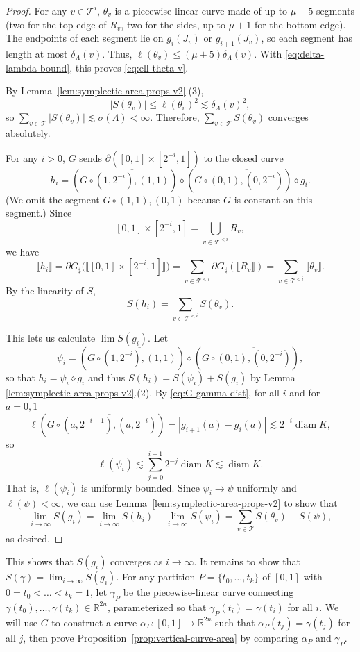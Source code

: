 \documentclass[12pt,reqno]{amsart}
\newcommand{\fcl}[1]{\llbracket{#1}\rrbracket}
\newcommand{\cT}{\mathcal{T}}
\newcommand{\R}{\mathbb{R}}
\newcommand{\from}{\colon}
\theoremstyle{remark}
\newcommand{\0}{\mathbf{0}}
\renewcommand{\1}{\mathbf 1}
\DeclareMathOperator{\diam}{diam}
\begin{document}
\begin{proof}
  For any $v\in \cT^i$, $\theta_v$ is a piecewise-linear curve made of up to $\mu+5$ segments (two for the top edge of $R_v$, two for the sides, up to $\mu+1$ for the bottom edge). The endpoints of each segment lie on $g_i(J_v)$ or $g_{i+1}(J_v)$, so each segment has length at most $\delta_\Lambda(v)$. Thus, $\ell(\theta_v) \le (\mu + 5)\delta_\Lambda(v)$. With \eqref{eq:delta-lambda-bound}, this proves \eqref{eq:ell-theta-v}. 

  By Lemma~\ref{lem:symplectic-area-props-v2}.(3),
  $$
  |S(\theta_v)| \leq \ell(\theta_v)^2 \lesssim \delta_\Lambda(v)^2,
  $$
  so $\sum_{v\in \cT} |S(\theta_v)| \lesssim \sigma(\Lambda)<\infty$. Therefore, $\sum_{v\in \cT}S(\theta_v)$ converges absolutely.

  For any $i>0$, $G$ sends $\partial([0,1]\times [2^{-i},1])$ to the closed curve
  $$h_i = (G\circ \overline{(1,2^{-i}),(1,1)}) \diamond (G\circ \overline{(0,1),(0,2^{-i})}) \diamond g_i.$$
  (We omit the segment $G\circ \overline{(1,1),(0,1)}$ because $G$ is constant on this segment.)
  Since   
  $$[0,1]\times [2^{-i},1] = \bigcup_{v\in \cT^{<i}}R_v,$$
  we have
  $$
  \fcl{h_i} = \partial G_\sharp\Big(\big\llbracket[0,1]\times [2^{-i},1]\big\rrbracket\Big) = \sum_{v\in \cT^{<i}} \partial G_\sharp(\fcl{R_v}) = \sum_{v\in \cT^{<i}}\fcl{\theta_v}.
  $$
  By the linearity of $S$,
  $$
  S(h_i) = \sum_{v\in \cT^{<i}}S(\theta_v).
  $$

  This lets us calculate $\lim S(g_i)$. Let
  $$\psi_i = \left(G\circ \overline{(1,2^{-i}),(1,1)}\right) \diamond \left(G\circ \overline{(0,1),(0,2^{-i})}\right),$$
  so that $h_i = \psi_i \diamond g_i$ and thus $S(h_i) = S(\psi_i) + S(g_i)$ by Lemma \ref{lem:symplectic-area-props-v2}.(2).
  By \eqref{eq:G-gamma-dist}, for all $i$ and for $a=0,1$
  $$\ell(G \circ \overline{(a,2^{-i-1}),(a,2^{-i})}) = |g_{i+1}(a) - g_i(a)| \lesssim 2^{-i}\diam K,$$
  so
  $$\ell(\psi_i) \lesssim \sum_{j=0}^{i-1} 2^{-j}\diam K \lesssim \diam K.$$
  That is, $\ell(\psi_i)$ is uniformly bounded. Since $\psi_i\to \psi$ uniformly and $\ell(\psi)<\infty$, we can use Lemma~\ref{lem:symplectic-area-props-v2} to show that
  $$
  \lim_{i\to \infty} S(g_i) = \lim_{i\to \infty} S(h_i) - \lim_{i\to \infty} S(\psi_i) = \sum_{v\in \cT}S(\theta_v) - S(\psi),
  $$
  as desired.
\end{proof}

This shows that $S(g_i)$ converges as $i\to \infty$. It remains to show that $S(\gamma) = \lim_{i\to \infty} S(g_i)$. For any partition
$P=\{t_0,\dots,t_k\}$ of $[0,1]$ with $0=t_0<\dots<t_k=1$, let $\gamma_P$ be the piecewise-linear curve connecting $\gamma(t_0),\dots, \gamma(t_{k}) \in \R^{2n}$, parameterized so that $\gamma_P(t_i) = \gamma(t_i)$ for all $i$. 
We will use $G$ to construct a curve $\alpha_P\from [0,1]\to \R^{2n}$ such that $\alpha_P(t_j) = \gamma(t_j)$ for all $j$, then prove Proposition~\ref{prop:vertical-curve-area} by comparing $\alpha_P$ and $\gamma_P$.
\end{document}
